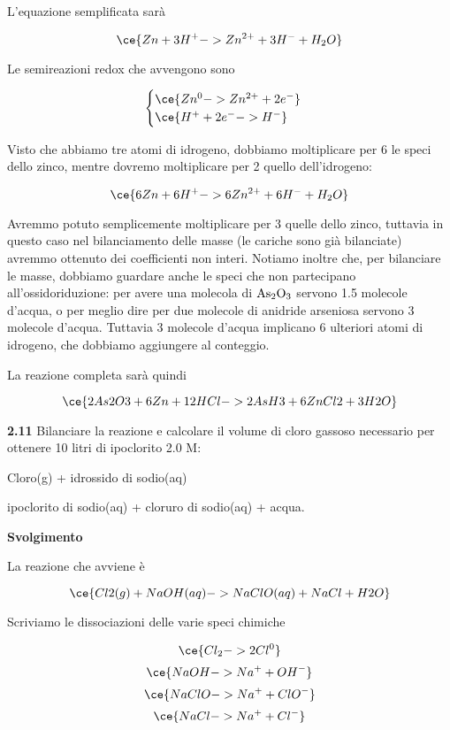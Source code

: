 L'equazione semplificata sarà

$$\ce{Zn + 3H^+ -> Zn^{2+} + 3H^- + H_2O }$$

Le semireazioni redox che avvengono sono

$$\begin{cases}
    \ce{Zn^{0} -> Zn^{2+} + 2e^-}\\
    \ce{H^+ + 2e^- -> H^-}
\end{cases}$$

Visto che abbiamo tre atomi di idrogeno, dobbiamo moltiplicare per 6 le speci dello zinco, mentre dovremo moltiplicare per 2 quello dell'idrogeno:

$$\ce{6Zn + 6H^+ -> 6Zn^{2+} + 6H^- + H_2O}$$

Avremmo potuto semplicemente moltiplicare per 3 quelle dello zinco, tuttavia in questo caso nel bilanciamento delle masse (le cariche sono già bilanciate) avremmo ottenuto dei coefficienti non interi. Notiamo inoltre che, per bilanciare le masse, dobbiamo guardare anche le speci che non partecipano all'ossidoriduzione: per avere una molecola di $\rm As_2O_3$ servono 1.5 molecole d'acqua, o per meglio dire per due molecole di anidride arseniosa servono 3 molecole d'acqua. Tuttavia 3 molecole d'acqua implicano 6 ulteriori atomi di idrogeno, che dobbiamo aggiungere al conteggio.

La reazione completa sarà quindi 

$$\ce{2As2O3 + 6Zn + 12HCl -> 2AsH3 + 6ZnCl2 + 3H2O}$$

\vspace{0.2cm}\textbf{2.11} Bilanciare la reazione e calcolare il volume di cloro gassoso necessario per ottenere 10 litri di ipoclorito 2.0 M:

\begin{center}
    Cloro(g) + idrossido di sodio(aq) \ce{->} 
    
    \ce{->} ipoclorito di sodio(aq) + cloruro di sodio(aq) + acqua. 
\end{center}

\vspace{0.2cm}\large\textbf{Svolgimento}\normalsize

\vspace{0.2cm}La reazione che avviene è

$$\ce{Cl2(g) + NaOH(aq) ->  NaClO(aq) + NaCl + H2O}$$

Scriviamo le dissociazioni delle varie speci chimiche

$$\ce{Cl_2 -> 2Cl^0 }$$
$$\ce{NaOH -> Na^+ + OH^-}$$
$$\ce{NaClO -> Na^+ + ClO^-}$$
$$\ce{NaCl -> Na^+ + Cl^-}$$


